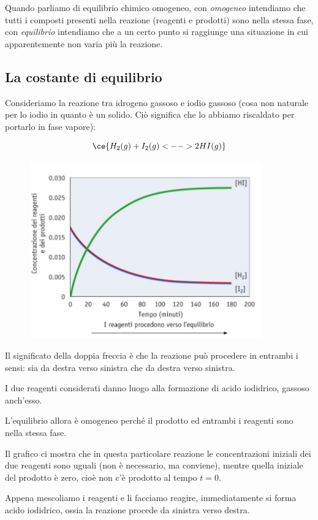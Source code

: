 Quando parliamo di equilibrio chimico omogeneo, con \textit{omogeneo} intendiamo che tutti i composti presenti nella reazione (reagenti e prodotti) sono nella stessa fase, con \textit{equilibrio} intendiamo che a un certo punto si raggiunge una situazione in cui apparentemente non varia più la reazione.
\subsection{La costante di equilibrio}
Consideriamo la reazione tra idrogeno gassoso e iodio gassoso (cosa non naturale per lo iodio in quanto è un solido. Ciò significa che lo abbiamo riscaldato per portarlo in fase vapore):

$$\ce{H_2(g) + I_2(g) <--> 2HI(g)}$$
\vspace{-1cm}\begin{figure}[htp]
    \centering
    \includegraphics[width=10cm]{immagini/equilibrio_chimico.png}
\end{figure}

Il significato della doppia freccia è che la reazione può procedere in entrambi i sensi: sia da destra verso sinistra che da destra verso sinistra.

I due reagenti considerati danno luogo alla formazione di acido iodidrico, gassoso anch'esso.

L'equilibrio allora è omogeneo perché il prodotto ed entrambi i reagenti sono nella stessa fase.

Il grafico ci mostra che in questa particolare reazione le concentrazioni iniziali dei due reagenti sono uguali (non è necessario, ma conviene), mentre quella iniziale del prodotto è zero, cioè non c'è prodotto al tempo $t=0$.

Appena mescoliamo i reagenti e li facciamo reagire, immediatamente si forma acido iodidrico, ossia la reazione procede da sinistra verso destra.

